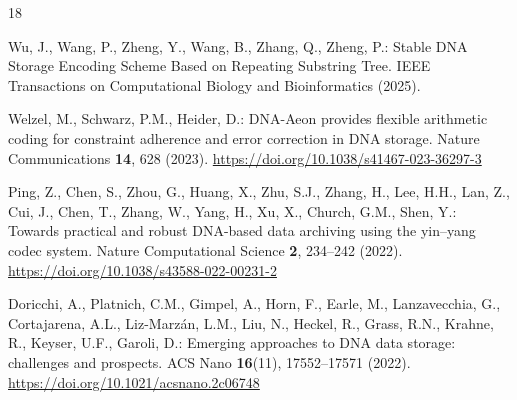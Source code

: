 \documentclass[runningheads]{llncs}
\begin{document}
\begin{thebibliography}{18}

Wu, J., Wang, P., Zheng, Y., Wang, B., Zhang, Q., Zheng, P.: Stable DNA
Storage Encoding Scheme Based on Repeating Substring Tree. IEEE Transactions
on Computational Biology and Bioinformatics (2025).

Welzel, M., Schwarz, P.M., Heider, D.: DNA-Aeon provides flexible
arithmetic coding for constraint adherence and error correction in
DNA storage. Nature Communications \textbf{14}, 628 (2023).
\url{https://doi.org/10.1038/s41467-023-36297-3}

Ping, Z., Chen, S., Zhou, G., Huang, X., Zhu, S.J., Zhang, H., Lee,
H.H., Lan, Z., Cui, J., Chen, T., Zhang, W., Yang, H., Xu, X.,
Church, G.M., Shen, Y.: Towards practical and robust DNA-based data
archiving using the yin--yang codec system. Nature Computational
Science \textbf{2}, 234--242 (2022).
\url{https://doi.org/10.1038/s43588-022-00231-2}

Doricchi, A., Platnich, C.M., Gimpel, A., Horn, F., Earle, M.,
Lanzavecchia, G., Cortajarena, A.L., Liz-Marz\'an, L.M., Liu, N.,
Heckel, R., Grass, R.N., Krahne, R., Keyser, U.F., Garoli, D.:
Emerging approaches to DNA data storage: challenges and prospects.
ACS Nano \textbf{16}(11), 17552--17571 (2022).
\url{https://doi.org/10.1021/acsnano.2c06748}


\end{thebibliography}
\end{document}
